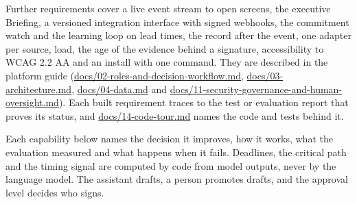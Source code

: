 \documentclass[fontsize=10pt,a4paper,DIV=12,parskip=half-,numbers=noenddot,headsepline,captions=tableheading]{scrartcl}
\begin{document}
Further requirements cover a live event stream to open screens, the executive Briefing, a versioned integration interface with signed webhooks, the commitment watch and the learning loop on lead times, the record after the event, one adapter per source, load, the age of the evidence behind a signature, accessibility to WCAG 2.2 AA \citep{w3c_wcag22} and an install with one command. They are described in the platform guide (\url{docs/02-roles-and-decision-workflow.md}, \url{docs/03-architecture.md}, \url{docs/04-data.md} and \url{docs/11-security-governance-and-human-oversight.md}). Each built requirement traces to the test or evaluation report that proves its status, and \url{docs/14-code-tour.md} names the code and tests behind it.

Each capability below names the decision it improves, how it works, what the evaluation measured and what happens when it fails. Deadlines, the critical path and the timing signal are computed by code from model outputs, never by the language model. The assistant drafts, a person promotes drafts, and the approval level decides who signs.
\end{document}
